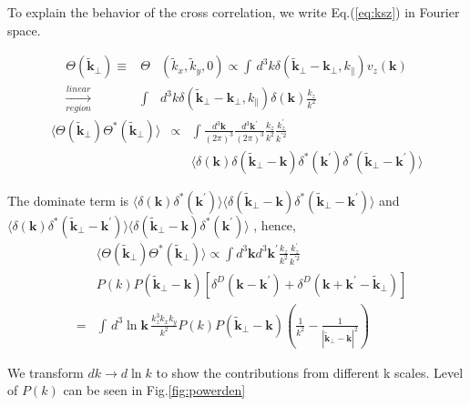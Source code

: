 To explain the behavior of the cross correlation, we write Eq.(\ref{eq:ksz}) in Fourier space.

\begin{eqnarray}
    \Theta(\tilde{\bm{k}}_\perp)\equiv&\Theta&(\tilde{k}_x,\tilde{k}_y,0)\propto\int\, d^3k\delta(\tilde{\bm{k}}_\perp-\bm{k_\perp},k_\parallel) v_z(\bm{k})\nonumber\\
    \xrightarrow[region]{linear}&\int& d^3k\delta(\tilde{\bm{k}}_\perp-\bm{k_\perp},k_\parallel)\delta(\bm{k})\frac{k_z}{k^2}
    \end{eqnarray}
\begin{eqnarray}
    \langle\Theta(\tilde{\bm{k}}_\perp)\Theta^{\ast}(\tilde{\bm{k}}_\perp)\rangle
    &\propto&\int \frac{d^3 \bm{k}}{(2\pi)^3}\frac{d^3 \bm{k^\prime}}{(2\pi)^3}
    \frac{k_z}{k^2}\frac{k^\prime_z}{k^{\prime2}}\\
    &&\langle \delta(\bm{k})\delta(\tilde{\bm{k}}_\perp-\bm{k})
    \delta^\ast(\bm{k^\prime})\delta^\ast(\tilde{\bm{k}}_\perp-\bm{k^\prime})\rangle
    \nonumber
\end{eqnarray}

The dominate term is 
$
    \langle \delta(\bm{k})\delta^\ast(\bm{k^\prime}) \rangle
    \langle \delta(\tilde{\bm{k}}_\perp-\bm{k})
    \delta^\ast(\tilde{\bm{k}}_\perp-\bm{k^\prime})\rangle
$ and 
$
    \langle \delta(\bm{k})
    \delta^\ast(\tilde{\bm{k}}_\perp-\bm{k^\prime})\rangle
    \langle \delta(\tilde{\bm{k}}_\perp-\bm{k})
    \delta^\ast(\bm{k^\prime}) \rangle
$
, hence, 
\begin{eqnarray}
    &&\langle\Theta(\tilde{\bm{k}}_\perp)\Theta^{\ast}(\tilde{\bm{k}}_\perp)\rangle
    \propto\int d^3 \bm{k}d^3 \bm{k^\prime}
    \frac{k_z}{k^2}\frac{k^\prime_z}{k^{\prime2}}
    \\
    &&P(k)P(\tilde{\bm{k}}_\perp-\bm{k})
    [\delta^D(\bm{k}-\bm{k^\prime})+\delta^D(\bm{k}+\bm{k^\prime}-\tilde{\bm{k}}_\perp)]\nonumber\\
    &=&\int\, d^3\ln \bm{k}\, \frac{k_z^3k_xk_y}{k^2}
    P(k)P(\tilde{\bm{k}}_\perp-\bm{k})
    (\frac{1}{k^2}-\frac{1}{|\tilde{\bm{k}}_\perp-\bm{k}|^2})\nonumber
\end{eqnarray}

    We transform $dk\rightarrow d\ln k$ 
    to show the contributions from different k scales.
    Level of $P(k)$ can be seen in Fig.\ref{fig:powerden}


